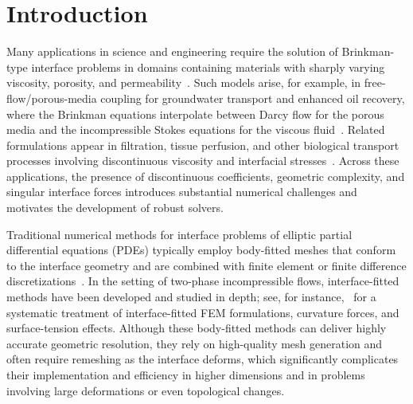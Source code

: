 \documentclass[preprint,11pt]{elsarticle}
\theoremstyle{remark}
\begin{document}
\section{Introduction}
Many applications in science and engineering require the solution of Brinkman-type interface problems in domains containing materials with sharply varying viscosity, porosity, and permeability~\cite{durlofsky1987analysis,auriault2009domain,Brinkman1949, NieldBejan2017,Pozrikidis1992, BarthesBiesel2016}. 
Such models arise, for example, in free-flow/porous-media coupling for groundwater transport and enhanced oil recovery, where the Brinkman equations interpolate between Darcy flow for the porous media and the incompressible Stokes equations for the viscous fluid~\cite{NieldBejan2017,Lesinigo2011DarcyBrinkman}. 
Related formulations appear in filtration, tissue perfusion, and other biological transport processes involving discontinuous viscosity and interfacial stresses~\cite{Kahshan2020DarcyBrinkmanFiltration, Rohan2021BiotDarcyBrinkman, KhaledVafai2003BioTissues}. 
Across these applications, the presence of discontinuous coefficients, geometric complexity, and singular interface forces introduces substantial numerical challenges and motivates the development of robust solvers.

Traditional numerical methods for interface problems of elliptic partial differential equations (PDEs) typically employ body-fitted meshes that conform to the interface geometry and are combined with finite element or finite difference discretizations~\cite{Babuska1970,Guyomarch2009,Bramble1996,Wang2004,xie2008uniformly,LiMelenkWohlmuthZou2010FEMInterface}. In the setting of two-phase incompressible flows, interface-fitted methods have been developed and studied in depth; see, for instance,~\cite{GrossReusken2011TwoPhase} for a systematic treatment of interface-fitted FEM formulations, curvature forces, and surface-tension effects. Although these body-fitted methods can deliver highly accurate geometric resolution, they rely on high-quality mesh generation and often require remeshing as the interface deforms, which significantly complicates their implementation and efficiency in higher dimensions and in problems involving large deformations or even topological changes.
\end{document}
